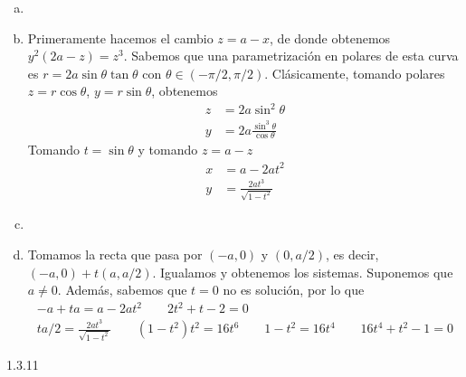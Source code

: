 \documentclass[twoside]{article}
\begin{document}
\begin{solucion}
\begin{enumerate}[a.]
\item[]
\item Primeramente hacemos el cambio $z=a-x$, de donde obtenemos $y^2(2a-z)=z^3$. Sabemos que una parametrización en polares de esta curva es $ r=2a\sin \theta \tan \theta$ con $\theta\in(-\pi/2,\pi/2)$. Clásicamente, tomando polares $z=r\cos \theta$, $y=r\sin \theta$, obtenemos
\begin{align*}
z&=2a\sin^2\theta\\
y&= 2a\frac{\sin^3\theta}{\cos \theta}
\end{align*}
Tomando $t = \sin \theta$ y tomando $z=a-z$
\begin{align*}
x&=a-2at^2\\
y&=\frac{2at^3}{\sqrt{1-t^2}}
\end{align*}
\item 
\item Tomamos la recta que pasa por $(-a,0)$ y $(0,a/2)$, es decir, $(-a,0)+t(a,a/2)$. Igualamos y obtenemos los sistemas. Suponemos que $a\neq 0$. Además, sabemos que $t=0$ no es solución, por lo que
\begin{gather*}
-a+ta = a-2at^2 \qquad 2t^2	+t-2=0\\
ta/2 = \frac{2at^3}{\sqrt{1-t^2}} \qquad (1-t^2)t^2 = 16t^6 \qquad 1-t^2 = 16t^4 \qquad 16t^4+t^2-1=0
\end{gather*}
\end{enumerate}
\end{solucion}

\newpage

\begin{ejercicio}{1.3.11}

\end{ejercicio}
\begin{solucion}

\end{solucion}
\end{document}
